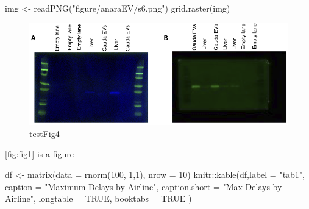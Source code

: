 \documentclass[12pt,twoside]{reedthesis}
\newenvironment{Shaded}{\begin{snugshade}}{\end{snugshade}}
\newcommand{\AttributeTok}[1]{\textcolor[rgb]{0.77,0.63,0.00}{#1}}
\newcommand{\ConstantTok}[1]{\textcolor[rgb]{0.00,0.00,0.00}{#1}}
\newcommand{\DecValTok}[1]{\textcolor[rgb]{0.00,0.00,0.81}{#1}}
\newcommand{\FunctionTok}[1]{\textcolor[rgb]{0.00,0.00,0.00}{#1}}
\newcommand{\NormalTok}[1]{#1}
\newcommand{\OtherTok}[1]{\textcolor[rgb]{0.56,0.35,0.01}{#1}}
\newcommand{\SpecialCharTok}[1]{\textcolor[rgb]{0.00,0.00,0.00}{#1}}
\newcommand{\StringTok}[1]{\textcolor[rgb]{0.31,0.60,0.02}{#1}}
\begin{document}
\begin{Shaded}
\begin{Highlighting}[]
\NormalTok{img }\OtherTok{\textless{}{-}} \FunctionTok{readPNG}\NormalTok{(}\StringTok{"figure/anaraEV/s6.png"}\NormalTok{)}
\FunctionTok{grid.raster}\NormalTok{(img)}
\end{Highlighting}
\end{Shaded}
\begin{figure}[H]

{\centering \includegraphics{thesis_files/figure-latex/sfig6-1} 

}

\caption{testFig4}\label{fig:sfig6}
\end{figure}
\ref{fig:fig1} is a figure
\begin{Shaded}
\begin{Highlighting}[]
\NormalTok{df }\OtherTok{\textless{}{-}} \FunctionTok{matrix}\NormalTok{(}\AttributeTok{data =} \FunctionTok{rnorm}\NormalTok{(}\DecValTok{100}\NormalTok{, }\DecValTok{1}\NormalTok{,}\DecValTok{1}\NormalTok{), }\AttributeTok{nrow =} \DecValTok{10}\NormalTok{)}
\NormalTok{knitr}\SpecialCharTok{::}\FunctionTok{kable}\NormalTok{(df,}\AttributeTok{label =} \StringTok{"tab1"}\NormalTok{,}
  \AttributeTok{caption =} \StringTok{"Maximum Delays by Airline"}\NormalTok{,}
  \AttributeTok{caption.short =} \StringTok{"Max Delays by Airline"}\NormalTok{,}
  \AttributeTok{longtable =} \ConstantTok{TRUE}\NormalTok{,}
  \AttributeTok{booktabs =} \ConstantTok{TRUE}
\NormalTok{)}
\end{Highlighting}
\end{Shaded}
\end{document}
